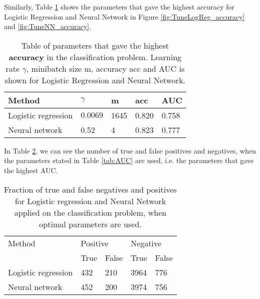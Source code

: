 Similarly, Table \ref{tab:acc} shows the parameters that gave the highest accuracy for Logistic Regression and Neural Network in Figure \ref{fig:TuneLogReg_accuracy} and \ref{fig:TuneNN_accuracy}.

\begin{table}[htbp]
	\renewcommand{\arraystretch}{1.2}
	\centering
	\caption{Table of parameters that gave the highest \textbf{accuracy} in the classification problem. Learning rate $\gamma$, minibatch size m, accuracy acc and AUC is shown for Logistic Regression and Neural Network.}
	\begin{tabular}{p{18mm} p{10mm} p{10mm} p{10mm} p{10mm}}
		\toprule
		Method & $\gamma$ & m & acc & AUC \\
		\midrule
		Logistic \newline regression & $0.0069$ & 1645 & 0.820 &  0.758\\
		Neural \newline network & 0.52 & 4 & 0.823 & 0.777 \\
		\bottomrule
	\end{tabular}
	\label{tab:acc}
\end{table}


In Table \ref{tab:confusion}, we can see the number of true and false positives and negatives, when the parameters stated in Table \ref{tab:AUC} are used, i.e. the parameters that gave the highest AUC.
\begin{table}[htbp]
	\centering
	\renewcommand{\arraystretch}{1.2}
	\caption{Fraction of true and false negatives and positives for Logistic regression and Neural Network applied on the classification problem, when optimal parameters are used.}
	\begin{tabular}{p{18mm} l l l l}
		\toprule
		Method & \multicolumn{2}{l}{Positive} & \multicolumn{2}{l}{Negative} \\
		\cline{2-3} \cline{4-5}
		& True & False & True & False \\
		\midrule
		Logistic \newline regression & 432 & 210 & 3964 & 776 \\
		Neural \newline network & 452 & 200 & 3974 & 756 \\
		\bottomrule
	\end{tabular}
	\label{tab:confusion}
\end{table}

